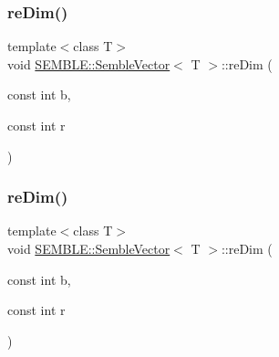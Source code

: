 \subsubsection{\texorpdfstring{reDim()}{reDim()}\hspace{0.1cm}{\footnotesize\ttfamily [1/2]}}
{\footnotesize\ttfamily template$<$class T$>$ \\
void \mbox{\hyperlink{structSEMBLE_1_1SembleVector}{S\+E\+M\+B\+L\+E\+::\+Semble\+Vector}}$<$ T $>$\+::re\+Dim (\begin{DoxyParamCaption}\item[{const int}]{b,  }\item[{const int}]{r }\end{DoxyParamCaption})\hspace{0.3cm}{\ttfamily [inline]}}

\mbox{\label{structSEMBLE_1_1SembleVector_a145668e54bc3ebd9a47e7bfd2646947a}} 
\subsubsection{\texorpdfstring{reDim()}{reDim()}\hspace{0.1cm}{\footnotesize\ttfamily [2/2]}}
{\footnotesize\ttfamily template$<$class T$>$ \\
void \mbox{\hyperlink{structSEMBLE_1_1SembleVector}{S\+E\+M\+B\+L\+E\+::\+Semble\+Vector}}$<$ T $>$\+::re\+Dim (\begin{DoxyParamCaption}\item[{const int}]{b,  }\item[{const int}]{r }\end{DoxyParamCaption})\hspace{0.3cm}{\ttfamily [inline]}}

